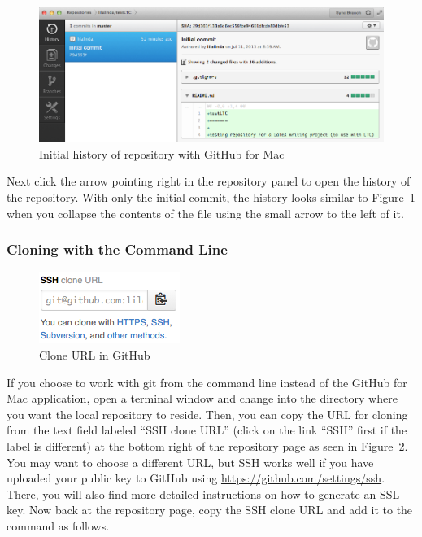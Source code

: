 \begin{figure}
\centering
\includegraphics[scale=\myscale]{figures/github-mac-history}
\caption{Initial history of repository with GitHub for Mac} \label{fig:github-mac-history}
\end{figure}
Next click the arrow pointing right in the repository panel to open the history of the repository.  With only the initial commit, the history looks similar to Figure~\ref{fig:github-mac-history} when you collapse the contents of the  file using the small arrow to the left of it. 

\subsubsection{Cloning with the Command Line}

\begin{figure}
\centering
\includegraphics[scale=\myscale]{figures/clone-URL}
\caption{Clone URL in GitHub} \label{fig:clone-URL}
\end{figure}
If you choose to work with git from the command line instead of the GitHub for Mac application, open a terminal window and change into the directory where you want the local repository to reside.  Then, you can copy the URL for cloning from the text field labeled ``SSH clone URL'' (click on the link ``SSH'' first if the label is different) at the bottom right of the repository page as seen in Figure~\ref{fig:clone-URL}.  You may want to choose a different URL, but SSH works well if you have uploaded your public key to GitHub using \url{https://github.com/settings/ssh}.  There, you will also find more detailed instructions on how to generate an SSL key.  Now back at the repository page, copy the SSH clone URL and add it to the  command as follows.

